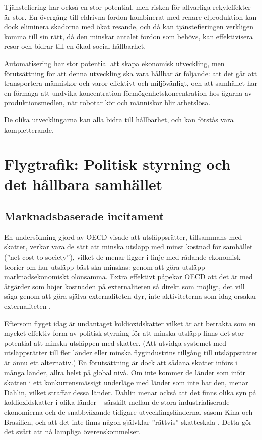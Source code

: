 \documentclass{article}
\begin{document}
Tjänstefiering har också en stor potential, men risken för allvarliga rekyleffekter är stor. En övergång till eldrivna fordon kombinerat med renare elproduktion kan dock eliminera skadorna med ökat resande, och då kan tjänstefieringen verkligen komma till sin rätt, då den minskar antalet fordon som behövs, kan effektivisera resor och bidrar till en ökad social hållbarhet.

Automatisering har stor potential att skapa ekonomisk utveckling, men förutsättning för att denna utveckling ska vara hållbar är följande: att det går att transportera människor och varor effektivt och miljövänligt, och att samhället har en förmåga att undvika koncentration förmögenhetskoncentration hos ägarna av produktionsmedlen, när robotar kör och människor blir arbetslösa.

De olika utvecklingarna kan alla bidra till hållbarhet, och kan förstås vara kompletterande.


\clearpage
\section{Flygtrafik: Politisk styrning och det hållbara samhället}

\subsection{Marknadsbaserade incitament}

En undersökning gjord av OECD visade att utsläppsrätter, tillsammans med skatter, verkar vara de  sätt att minska utsläpp med minst kostnad för samhället (''net cost to society''), vilket de menar ligger i linje med rådande ekonomisk teorier om hur utsläpp bäst ska minskas: genom att göra utsläpp marknadsekonomiskt olönsamma. Extra effektivt påpekar OECD att det är med åtgärder som höjer kostnaden på externaliteten så direkt som möjligt, det vill säga genom att göra själva externaliteten dyr, inte aktiviteterna som idag orsakar externaliteten .

Eftersom flyget idag är undantaget koldioxidskatter  vilket är att betrakta som en mycket effektiv form av politisk styrning för att minska utsläpp finns det stor potential att minska utsläppen med skatter. (Att utvidga systemet med utsläppsrätter till fler länder eller minska flygindustrins tillgång till utsläppsrätter är ännu ett alternativ.) En förutsättning är dock att sådana skatter införs i många länder, allra helst på global nivå. Om inte kommer de länder som inför skatten i ett konkurrensmässigt underläge med länder som inte har den, menar Dahlin, vilket straffar dessa länder. Dahlin menar också att det finns olika syn på koldioxidskatter i olika länder – särskilt mellan de stora industrialiserade ekonomierna och de snabbväxande tidigare utvecklingsländerna, såsom Kina och Brasilien, och att det inte finns någon självklar ''rättvis'' skatteskala . Detta gör det svårt att nå lämpliga överenskommelser.
\end{document}
